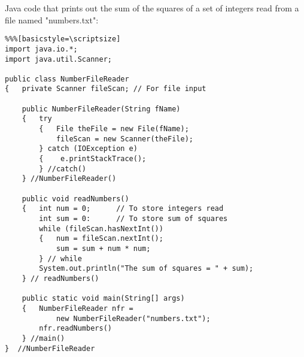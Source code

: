 \begin{ANS}
\pagebreak
\item
Java code that prints out the sum of the
squares of a set of integers read from a file named "numbers.txt":

\begin{jjjlisting}
\begin{lstlisting}%%%[basicstyle=\scriptsize]
import java.io.*;
import java.util.Scanner;

public class NumberFileReader
{   private Scanner fileScan; // For file input
   
    public NumberFileReader(String fName)
    {   try
        {   File theFile = new File(fName);
            fileScan = new Scanner(theFile);
        } catch (IOException e)
        {    e.printStackTrace();
        } //catch()
    } //NumberFileReader() 

    public void readNumbers()
    {   int num = 0;      // To store integers read
        int sum = 0:      // To store sum of squares
        while (fileScan.hasNextInt()) 
        {   num = fileScan.nextInt();
            sum = sum + num * num;
        } // while
        System.out.println("The sum of squares = " + sum);
    } // readNumbers()

    public static void main(String[] args)
    {   NumberFileReader nfr =
            new NumberFileReader("numbers.txt");
        nfr.readNumbers()
    } //main()
}  //NumberFileReader 
\end{lstlisting}
\end{jjjlisting}

\end{ANS}


